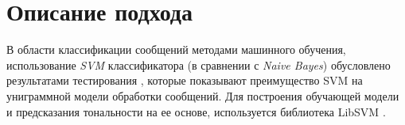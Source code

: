 \section{Описание подхода}
    \label{sec:buildingApproachDescription}
    В области классификации сообщений методами машинного обучения, использование
    {\it SVM} классификатора (в сравнении с {\it Naive Bayes}) обусловлено результатами
    тестирования \cite{svmAdvantages}, которые показывают преимущество SVM на униграммной
    модели обработки сообщений.
    Для построения обучающей модели и предсказания
    тональности на ее основе, используется библиотека LibSVM \cite{svmClassifier}.

